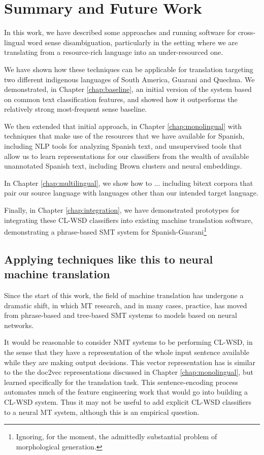 \chapter{Summary and Future Work}
\label{chap:conclusions}

In this work, we have described some approaches and running software for
cross-lingual word sense disambiguation, particularly in the setting where we
are translating from a resource-rich language into an under-resourced one.

We have shown how these techniques can be applicable for translation targeting
two different indigenous languages of South America, Guarani and Quechua. We
demonstrated, in Chapter \ref{chap:baseline}, an initial version of the system
based on common text classification features, and showed how it outperforms the
relatively strong most-frequent sense baseline.

We then extended that initial approach, in Chapter \ref{chap:monolingual} with
techniques that make use of the resources that we have available for Spanish,
including NLP tools for analyzing Spanish text, and unsupervised tools that
allow us to learn representations for our classifiers from the wealth of
available unannotated Spanish text, including Brown clusters and neural
embeddings.

In Chapter \ref{chap:multilingual}, we show how to ...
including bitext corpora that pair our source language with languages other
than our intended target language.

Finally, in Chapter \ref{chap:integration}, we have demonstrated prototypes for
integrating these CL-WSD classifiers into existing machine translation
software, demonstrating a phrase-based SMT system for
Spanish-Guarani\footnote{Ignoring, for the moment, the admittedly substantial
problem of morphological generation.} 


\section{Applying techniques like this to neural machine translation}
Since the start of this work, the field of machine translation has undergone a
dramatic shift, in which MT research, and in many cases, practice, has moved
from phrase-based and tree-based SMT systems to models based on neural
networks.

It would be reasonable to consider NMT systems to be performing CL-WSD, in the
sense that they have a representation of the whole input sentence available
while they are making output decisions. This vector representation has is
similar to the the doc2vec representations discussed in Chapter
\ref{chap:monolingual}, but learned specifically for the translation task. This
sentence-encoding process automates much of the feature engineering work that
would go into building a CL-WSD system. Thus it may not be useful to add
explicit CL-WSD classifiers to a neural MT system, although this is an
empirical question.

